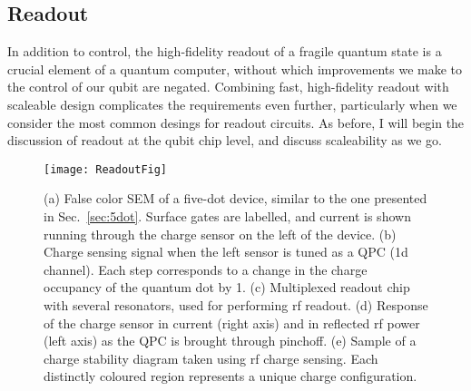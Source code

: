 \subsection{Readout}
\label{sec:readout}
In addition to control, the high-fidelity readout of a fragile quantum state is a crucial element of a quantum computer, without which improvements
we make to the control of our qubit are negated. Combining fast, high-fidelity readout with scaleable design complicates the requirements even further,
particularly when we consider the most common desings for readout circuits. As before, I will begin the discussion of readout at the qubit chip level,
and discuss scaleability as we go.

\begin{figure}
  \texttt{[image: ReadoutFig]}
  \caption[Readout of a semiconductor quantum dot]
  {\label{fig:readout}(a) False color SEM of a five-dot device, similar to the one presented in Sec.~\ref{sec:5dot}. Surface gates are labelled, and
  current is shown running through the charge sensor on the left of the device. (b) Charge sensing signal when the left sensor is tuned as a QPC (1d channel).
  Each step corresponds to a change in the charge occupancy of the quantum dot by 1. (c) Multiplexed readout chip with several resonators, used for
  performing rf readout. (d) Response of the charge sensor in current (right axis) and in reflected rf power (left axis) as the QPC is brought through pinchoff.
  (e) Sample of a charge stability diagram taken using rf charge sensing. Each distinctly coloured region represents a unique charge configuration.}
\end{figure}

